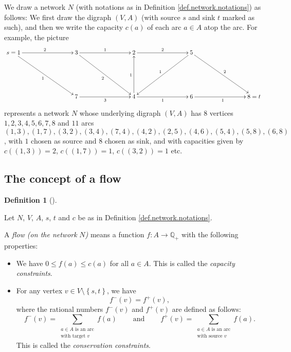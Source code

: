 \documentclass[numbers=enddot,12pt,final,onecolumn,notitlepage]{scrartcl}%
\theoremstyle{definition}
\newtheorem{defi}[theo]{Definition}
\newenvironment{definition}[1][]
{\begin{defi}[#1]\begin{leftbar}}
{\end{leftbar}\end{defi}}
\let\sumnonlimits\sum
\renewcommand{\sum}{\sumnonlimits\limits}
\begin{document}
We draw a network $N$ (with notations as in Definition
\ref{def.network.notations}) as follows: We first draw the digraph $\left(
V,A\right)  $ (with source $s$ and sink $t$ marked as such), and then we write
the capacity $c\left(  a\right)  $ of each arc $a\in A$ atop the arc. For
example, the picture%
\begin{equation}%
\xymatrix@C=7pc@R=5pc{
s = 1 \ar[r]^2 \ar[dr]_1 & 3 \ar[r]^1 \ar[dr]_2 & 2 \ar[r]^2 & 5 \ar
[dl]_1 \ar[dr]^2 \\
& 7 \ar[r]_3 & 4 \ar[u]^1 \ar[r]_1 & 6 \ar[r]_1 & 8 = t
}
\label{eq.network.example.1}%
\end{equation}
represents a network $N$ whose underlying digraph $\left(  V,A\right)  $ has
$8$ vertices \newline$1,2,3,4,5,6,7,8$ and $11$ arcs \newline$\left(
1,3\right)  ,\left(  1,7\right)  ,\left(  3,2\right)  ,\left(  3,4\right)
,\left(  7,4\right)  ,\left(  4,2\right)  ,\left(  2,5\right)  ,\left(
4,6\right)  ,\left(  5,4\right)  ,\left(  5,8\right)  ,\left(  6,8\right)  $,
with $1$ chosen as source and $8$ chosen as sink, and with capacities given by
$c\left(  \left(  1,3\right)  \right)  =2$, $c\left(  \left(  1,7\right)
\right)  =1$, $c\left(  \left(  3,2\right)  \right)  =1$ etc.

\subsection{The concept of a flow}

\begin{definition}
\label{def.flow.def}Let $N$, $V$, $A$, $s$, $t$ and $c$ be as in Definition
\ref{def.network.notations}.

A \textit{flow (on the network }$N$\textit{)} means a function $f:A\rightarrow
\mathbb{Q}_{+}$ with the following properties:

\begin{itemize}
\item We have $0\leq f\left(  a\right)  \leq c\left(  a\right)  $ for all
$a\in A$. This is called the \textit{capacity constraints}.

\item For any vertex $v\in V\setminus\left\{  s,t\right\}  $, we have%
\[
f^{-}\left(  v\right)  =f^{+}\left(  v\right)  ,
\]
where the rational numbers $f^{-}\left(  v\right)  $ and $f^{+}\left(
v\right)  $ are defined as follows:%
\[
f^{-}\left(  v\right)  =\sum_{\substack{a\in A\text{ is an arc}\\\text{with
target }v}}f\left(  a\right)  \ \ \ \ \ \ \ \ \ \ \text{and}%
\ \ \ \ \ \ \ \ \ \ f^{+}\left(  v\right)  =\sum_{\substack{a\in A\text{ is an
arc}\\\text{with source }v}}f\left(  a\right)  .
\]
This is called the \textit{conservation constraints}.
\end{itemize}
\end{definition}
\end{document}
